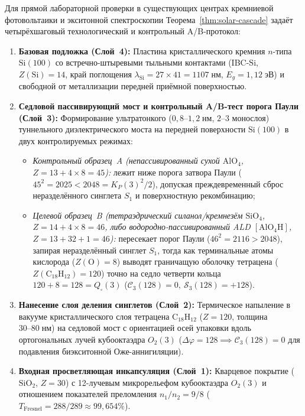 \documentclass[11pt,a4paper]{article}
\theoremstyle{plain}
\theoremstyle{definition}
\begin{document}
Для прямой лабораторной проверки в существующих центрах кремниевой фотовольтаики и экситонной спектроскопии Теорема~\ref{thm:solar-cascade} задаёт четырёхшаговый технологический и контрольный A/B-протокол:
\begin{enumerate}[label=\textbf{Шаг~\arabic*.},leftmargin=*]
\item \textbf{Базовая подложка (Слой~4):}
  Пластина кристаллического кремния $n$-типа $\mathrm{Si}(100)$ со встречно-штыревыми тыльными контактами (IBC-$\mathrm{Si}$, $Z(\mathrm{Si})=14$, край поглощения $\lambda_{\mathrm{Si}} = 27\times 41 = 1107\;\text{нм}$, $E_g = 1{,}12\;\text{эВ}$) и свободной от металлизации передней приёмной поверхностью.
\item \textbf{Седловой пассивирующий мост и контрольный A/B-тест порога Паули (Слой~3):}
  Формирование ультратонкого ($0{,}8\text{--}1{,}2\;\text{нм}$, $2\text{--}3$ монослоя) туннельного диэлектрического моста на передней поверхности $\mathrm{Si}(100)$ в двух контролируемых режимах:
  \begin{itemize}[noitemsep]
  \item \emph{Контрольный образец~A (непассивированный сухой $\mathrm{AlO_4}$, $Z = 13 + 4\times 8 = 45$):} лежит ниже порога затвора Паули ($45^2 = 2025 < 2048 = K_P(3)^2/2$), допуская преждевременный сброс неразделённого синглета $S_1$ и поверхностную рекомбинацию;
  \item \emph{Целевой образец~B (тетраэдрический силанол/кремнезём $\mathrm{SiO_4}$, $Z = 14 + 4\times 8 = 46$, либо водородно-пассивированный ALD $[\mathrm{AlO_4H}]$, $Z = 13 + 32 + 1 = 46$):} пересекает порог Паули ($46^2 = 2116 > 2048$), запирая неразделённый синглет $S_1$, тогда как терминальные атомы кислорода ($Z(\mathrm{O}) = 8$) выводят граничащую оболочку тетрацена ($Z(\mathrm{C_{18}H_{12}}) = 120$) точно на седло четверти кольца $120 + 8 = 128 = Q_\square(3)$ ($\mathcal{C}_3(128) = 0,\ \mathcal{S}_3(128) = +128$).
  \end{itemize}
\item \textbf{Нанесение слоя деления синглетов (Слой~2):}
  Термическое напыление в вакууме кристаллического слоя тетрацена $\mathrm{C_{18}H_{12}}$ ($Z = 120$, толщина $30\text{--}80\;\text{нм}$) на седловой мост с ориентацией осей упаковки вдоль ортогональных лучей кубооктаэдра $O_2(3)$ ($\Delta\varphi = 128 \implies \mathcal{C}_3(128) = 0$ для подавления биэкситонной Оже-аннигиляции).
\item \textbf{Входная просветляющая инкапсуляция (Слой~1):}
  Кварцевое покрытие ($\mathrm{SiO_2}$, $Z = 30$) с 12-лучевым микрорельефом кубооктаэдра $O_2(3)$ и отношением показателей преломления $n_1/n_2 = 9/8$ ($T_{\mathrm{Fresnel}} = 288/289 \approx 99{,}654\%$).
\end{enumerate}
\end{document}
